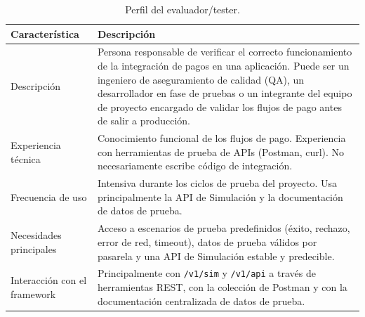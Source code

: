 \begin{table}[H]
  \centering
  \renewcommand{\arraystretch}{1.2}
  \begin{tabularx}{\textwidth}{|l|X|}
    \hline
    \textbf{Característica} & \textbf{Descripción} \\
    \hline
    Descripción & Persona responsable de verificar el correcto funcionamiento de la integración de pagos en una aplicación. Puede ser un ingeniero de aseguramiento de calidad (QA), un desarrollador en fase de pruebas o un integrante del equipo de proyecto encargado de validar los flujos de pago antes de salir a producción. \\
    \hline
    Experiencia técnica & Conocimiento funcional de los flujos de pago. Experiencia con herramientas de prueba de APIs (Postman, curl). No necesariamente escribe código de integración. \\
    \hline
    Frecuencia de uso & Intensiva durante los ciclos de prueba del proyecto. Usa principalmente la API de Simulación y la documentación de datos de prueba. \\
    \hline
    Necesidades principales & Acceso a escenarios de prueba predefinidos (éxito, rechazo, error de red, timeout), datos de prueba válidos por pasarela y una API de Simulación estable y predecible. \\
    \hline
    Interacción con el framework & Principalmente con \texttt{/v1/sim} y \texttt{/v1/api} a través de herramientas REST, con la colección de Postman y con la documentación centralizada de datos de prueba. \\
    \hline
  \end{tabularx}
  \caption{Perfil del evaluador/tester.}
  \label{tab:perfil-tester}
\end{table}
